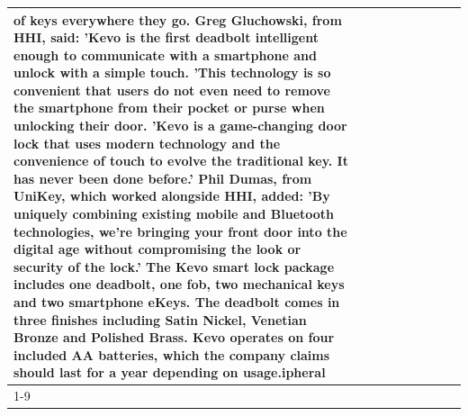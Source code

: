 \begin{table}[H]
\begin{tabular}{lllrlllll}
of keys everywhere they go. Greg Gluchowski, from HHI, said: 'Kevo is the first deadbolt intelligent enough to communicate with a smartphone and unlock with a simple touch. 'This technology is so convenient that users do not even need to remove the smartphone from their pocket or purse when unlocking their door. 'Kevo is a game-changing door lock that uses modern technology and the convenience of touch to evolve the traditional key. It has never been done before.' Phil Dumas, from UniKey, which worked alongside HHI, added: 'By uniquely combining existing mobile and Bluetooth technologies, we’re bringing your front door into the digital age without compromising the look or security of the lock.' The Kevo smart lock package includes one deadbolt, one fob, two mechanical keys and two smartphone eKeys. The deadbolt comes in three finishes including Satin Nickel, Venetian Bronze and Polished Brass. Kevo operates on four included AA batteries, which the company claims should last for a year depending on usage.ipheral \\
\cline{1-9}

\end{tabular}
\end{table}
